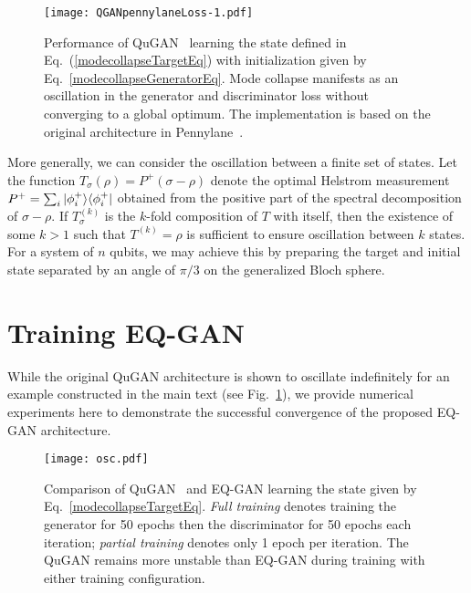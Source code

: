 \documentclass[prl,superscriptaddress,twocolumn]{revtex4}
\makeatletter
\newcommand{\sket}[1]{{\ensuremath{\lvert#1\rangle}}}
\newcommand{\lket}[1]{{\ensuremath{\left\lvert#1\right\rangle}}}
\newcommand{\ket}[1]{\if@display\lket{#1}\else\sket{#1}\fi}
\newcommand{\sbra}[1]{{\ensuremath{\langle#1\rvert}}}
\newcommand{\lbra}[1]{{\ensuremath{\left\langle#1\right\rvert}}}
\newcommand{\bra}[1]{\if@display\lbra{#1}\else\sbra{#1}\fi}
\theoremstyle{plain}
\theoremstyle{definition}
\makeatother
\begin{document}
\begin{figure}[h!]
\begin{center}
\texttt{[image: QGANpennylaneLoss-1.pdf]}
\caption{Performance of QuGAN~\cite{PhysRevA.98.012324,Lloyd2018} learning the state defined in Eq.~(\ref{modecollapseTargetEq}) with initialization given by Eq.~\ref{modecollapseGeneratorEq}. Mode collapse manifests as an oscillation in the generator and discriminator loss without converging to a global optimum. The implementation is based on the original architecture in Pennylane~\cite{bergholm2020pennylane}.}
\label{fig:pennylane}
\end{center}
\end{figure}

More generally, we can consider the oscillation between a finite set of states. Let the function $T_\sigma(\rho) = P^+(\sigma - \rho)$ denote the optimal Helstrom measurement $P^+ = \sum_i\ket{\phi_i^+}\bra{\phi_i^+}$ obtained from the positive part of the spectral decomposition of $\sigma - \rho$. If $T_\sigma^{(k)}$ is the $k$-fold composition of $T$ with itself, then the existence of some $k > 1$ such that $T^{(k)} = \rho$ is sufficient to ensure oscillation between $k$ states. For a system of $n$ qubits, we may achieve this by preparing the target and initial state separated by an angle of $\pi/3$ on the generalized Bloch sphere.


\section{Training EQ-GAN}
While the original QuGAN architecture is shown to oscillate indefinitely for an example constructed in the main text (see Fig.~\ref{fig:pennylane}), we provide numerical experiments here to demonstrate the successful convergence of the proposed EQ-GAN architecture.

\begin{figure}[h!]
\begin{center}
\texttt{[image: osc.pdf]}
\caption{Comparison of QuGAN~\cite{PhysRevA.98.012324,Lloyd2018} and EQ-GAN learning the state given by Eq.~\ref{modecollapseTargetEq}. \emph{Full training} denotes training the generator for 50 epochs then the discriminator for 50 epochs each iteration; \emph{partial training} denotes only 1 epoch per iteration. The QuGAN remains more unstable than EQ-GAN during training with either training configuration.}
\label{fig:osc}
\end{center}
\end{figure}
\end{document}
